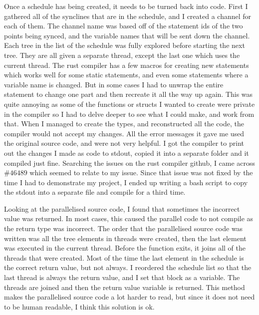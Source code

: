 Once a schedule has being created, it needs to be turned back into code. First I gathered all of the synclines that are in the schedule, and I created a channel for each of them. The channel name was based off of the statement ids of the two points being synced, and the variable names that will be sent down the channel. Each tree in the list of the schedule was fully explored before starting the next tree. They are all given a separate thread, except the last one which uses the current thread. The rust compiler has a few macros for creating new statements which works well for some static statements, and even some statements where a variable name is changed. But in some cases I had to unwrap the entire statement to change one part and then recreate it all the way up again. This was quite annoying as some of the functions or structs I wanted to create were private in the compiler so I had to delve deeper to see what I could make, and work from that. When I managed to create the types, and reconstructed all the code, the compiler would not accept my changes. All the error messages it gave me used the original source code, and were not very helpful. I got the compiler to print out the changes I made as code to stdout, copied it into a separate folder and it compiled just fine. Searching the issues on the rust compiler github, I came across \href{https://github.com/rust-lang/rust/issues/46489}{$\#46489$} which seemed to relate to my issue. Since that issue was not fixed by the time I had to demonstrate my project, I ended up writing a bash script to copy the stdout into a separate file and compile for a third time.

 Looking at the parallelised source code, I found that sometimes the incorrect value was returned. In most cases, this caused the parallel code to not compile as the return type was incorrect. The order that the parallelised source code was written was all the tree elements in threads were created, then the last element was executed in the current thread. Before the function exits, it joins all of the threads that were created. Most of the time the last element in the schedule is the correct return value, but not always. I reordered the schedule list so that the last thread is always the return value, and I set that block as a variable. The threads are joined and then the return value variable is returned. This method makes the parallelised source code a lot harder to read, but since it does not need to be human readable, I think this solution is ok.

